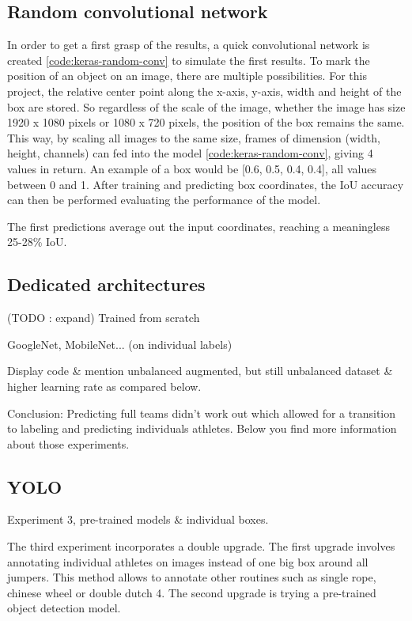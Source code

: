 \subsection{Random convolutional network}


In order to get a first grasp of the results, a quick convolutional network is created \ref{code:keras-random-conv} to simulate the first results. To mark the position of an object on an image, there are multiple possibilities.
For this project, the relative center point along the x-axis, y-axis, width and height of the box are stored. So regardless of the scale of the image, whether the image has size 1920 x 1080 pixels or 1080 x 720 pixels, the position of the box remains the same.
This way, by scaling all images to the same size, frames of dimension (width, height, channels) can fed into the model \ref{code:keras-random-conv}, giving 4 values in return. An example of a box would be [0.6, 0.5, 0.4, 0.4], all values between 0 and 1.
After training and predicting box coordinates, the IoU accuracy can then be performed evaluating the performance of the model.

The first predictions average out the input coordinates, reaching a meaningless 25-28\% IoU.

\subsection{Dedicated architectures}

(TODO : expand)
Trained from scratch

GoogleNet, MobileNet... (on individual labels)

Display code \& mention unbalanced augmented, but still unbalanced dataset \& higher learning rate as compared below.

Conclusion:
Predicting full teams didn't work out which allowed for a transition to labeling and predicting individuals athletes. Below you find more information about those experiments.

\subsection{YOLO}

Experiment 3, pre-trained models \& individual boxes.

The third experiment incorporates a double upgrade. The first upgrade involves annotating individual athletes on images instead of one big box around all jumpers. This method allows to annotate other routines such as single rope, chinese wheel or double dutch 4. The second upgrade is trying a pre-trained object detection model.

